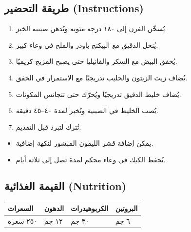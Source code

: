 \documentclass[11pt,a4paper]{article}
\begin{document}
\vspace{0.4cm}

\subsection*{طريقة التحضير (Instructions)}
\begin{enumerate}[label=\textarabic{\arabic*.},leftmargin=1.6em,itemsep=4pt]
  \item يُسخّن الفرن إلى ١٨٠ درجة مئوية وتُدهن صينية الخبز.
  \item يُنخل الدقيق مع البيكنج باودر والملح في وعاء كبير.
  \item يُخفق البيض مع السكر والفانيليا حتى يصبح المزيج كريميًا.
  \item يُضاف زيت الزيتون والحليب تدريجيًا مع الاستمرار في الخفق.
  \item يُضاف خليط الدقيق تدريجيًا ويُحرّك حتى تتجانس المكونات.
  \item يُصب الخليط في الصينية وتُخبز لمدة ٤٠–٤٥ دقيقة.
  \item تُترك لتبرد قبل التقديم.
\end{enumerate}

\vspace{0.5cm}

\begin{notesbox}
\begin{itemize}[leftmargin=1.2em,itemsep=2pt]
  \item يمكن إضافة قشر الليمون المبشور لنكهة إضافية.
  \item يُحفظ الكيك في وعاء محكم لمدة تصل إلى ثلاثة أيام.
\end{itemize}
\end{notesbox}

\vspace{0.5cm}

\subsection*{القيمة الغذائية (Nutrition)}
\noindent
\begin{tabularx}{\linewidth}{|X|X|X|X|}
\hline
\textbf{السعرات} & \textbf{الدهون} & \textbf{الكربوهيدرات} & \textbf{البروتين} \\
\hline
٢٥٠ سعرة & ١٢ جم & ٣٠ جم & ٦ جم \\
\hline
\end{tabularx}
\end{document}
